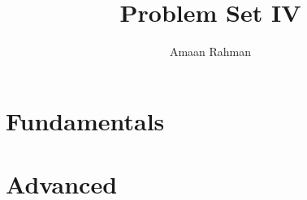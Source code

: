\documentclass[12pt]{article}
\title{Problem Set IV}
\author{Amaan Rahman}
\begin{document}
\maketitle
\section*{Fundamentals}

\section*{Advanced}

\end{document}
